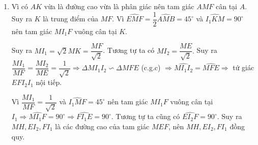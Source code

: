 \begin{ex}
{\begin{enumerate}
			Tương tự  $BI_2 \perp MI_1,$ suy ra $I$ là trực tâm của tam giác $MI_1I_2$ hay  $MI \perp I_1I_2.$
			
			\item  Vì có $AK$ vừa là đường cao vừa là phân giác nên  tam giác $AMF$ cân tại $A$. Suy ra $K$ là trung điểm của $MF$. Vì $\widehat{EMF} =\dfrac{1}{2}\widehat{AMB} = 45^\circ$ và $ \widehat{I_1KM} = 90^\circ$ nên tam giác $MI_1F$ vuông cân tại $K$. 
			
			Suy ra $MI_1=\sqrt{2}MK = \dfrac{MF}{\sqrt{2}}$. Tương tự ta có $MI_2 = \dfrac{ME}{\sqrt{2}}.$ Suy ra $\dfrac{MI_1}{MF} = \dfrac{MI_2}{ME} = \dfrac{1}{\sqrt{2}} \Rightarrow \Delta MI_1I_2 \backsim \Delta MFE$ (c.g.c)
			$\Rightarrow \widehat{MI_1I_2} = \widehat{MFE} \Rightarrow $ tứ giác $EFI_2I_1$ nội tiếp.
			
			Vì $\dfrac{MI_1}{MF} = \dfrac{1}{\sqrt{2}}$ và $\widehat{I_1MF} = 45^\circ$ nên tam giác $MI_1F$ vuông cân tại $I_1 \Rightarrow \widehat{MI_1F} = 90^\circ \Rightarrow \widehat{FI_1E} = 90^\circ$. Tương tự ta cũng có $\widehat{EI_2F} = 90^\circ.$ Suy ra $MH,EI_2,FI_1$ là các đường cao của tam giác $MEF$, nên $MH,EI_2,FI_1$ đồng quy.
		\end{enumerate}
		
	}
\end{ex}
